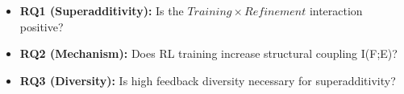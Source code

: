 
\begin{itemize}
\item \textbf{RQ1 (Superadditivity):} Is the $Training\times Refinement$ interaction positive?
\item \textbf{RQ2 (Mechanism):} Does RL training increase structural coupling I(F;E)?
\item \textbf{RQ3 (Diversity):} Is high feedback diversity necessary for superadditivity?
\end{itemize}
